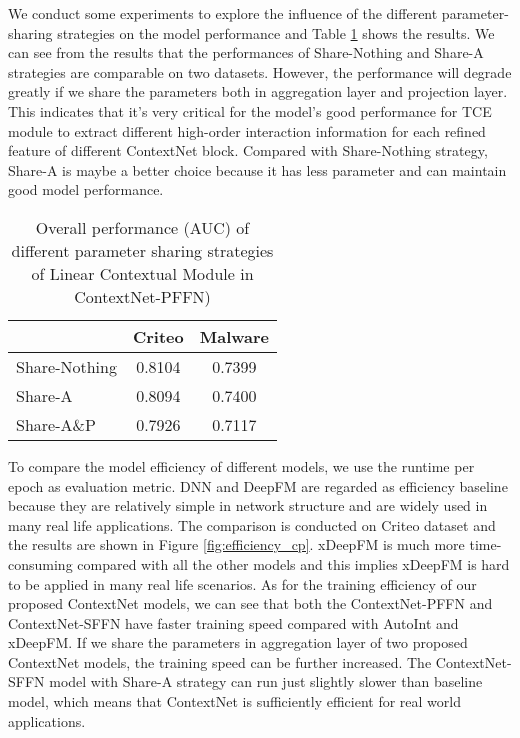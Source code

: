 \documentclass[sigconf]{acmart}
\begin{document}
We conduct some experiments to explore the influence of the different parameter-sharing strategies on the model performance and Table \ref{tab:paremeter-share} shows the results. We can see from the results that the performances of Share-Nothing and Share-A strategies are comparable on two datasets. However, the performance will degrade greatly if we share the parameters both in aggregation layer and projection layer. This indicates that it's very critical for the model's good performance for TCE module to extract different high-order interaction information for each refined feature of  different ContextNet block. Compared with Share-Nothing strategy, Share-A is maybe a better choice because it has less parameter and can maintain good model performance.


\begin{table}
\centering
\caption{ Overall performance (AUC) of different parameter sharing strategies of  Linear Contextual Module in ContextNet-PFFN)}
\begin{tabular}{l|cc}
\toprule
  & \textbf{Criteo} & \textbf{Malware}   \\
\midrule
Share-Nothing & 0.8104 & 0.7399 \\
Share-A &  0.8094 &  0.7400 \\
Share-A\&P & 0.7926 & 0.7117 \\
\bottomrule
\end{tabular}
\label{tab:paremeter-share}
\end{table}











To compare the model efficiency of different models, we use the runtime per epoch as evaluation metric. DNN and DeepFM are regarded as efficiency baseline because they are relatively simple in network structure and are widely used in many real life applications. The comparison is conducted on Criteo dataset and the results are shown in Figure \ref{fig:efficiency_cp}. xDeepFM is much more time-consuming compared with all the other models and this implies xDeepFM is hard to be applied in many real life scenarios. As for the training efficiency of our proposed ContextNet models, we can see that both the ContextNet-PFFN and ContextNet-SFFN have faster training speed compared with AutoInt and xDeepFM. If we share the parameters in aggregation layer of two proposed ContextNet models, the training speed can be further increased. The ContextNet-SFFN model with Share-A strategy can run just slightly slower than baseline model, which means that ContextNet is sufficiently efficient for real world applications.
\end{document}
